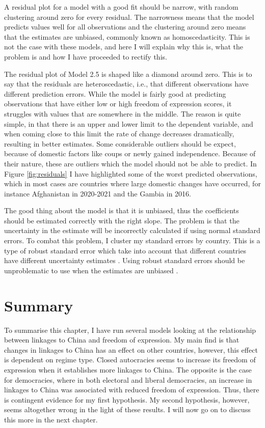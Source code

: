 A residual plot for a model with a good fit should be narrow, with random clustering around zero for every residual. The narrowness means that the model predicts values well for all observations and the clustering around zero means that the estimates are unbiased, commonly known as homoscedasticity. This is not the case with these models, and here I will explain why this is, what the problem is and how I have proceeded to rectify this.

The residual plot of Model 2.5 is shaped like a diamond around zero. This is to say that the residuals are heteroscedastic, i.e., that different observations have different prediction errors. While the model is fairly good at predicting observations that have either low or high freedom of expression scores, it struggles with values that are somewhere in the middle. The reason is quite simple, in that there is an upper and lower limit to the dependent variable, and when coming close to this limit the rate of change decreases dramatically, resulting in better estimates. Some considerable outliers should be expect, because of domestic factors like coups or newly gained independence. Because of their nature, these are outliers which the model should not be able to predict. In Figure \ref{fig:residuals} I have highlighted some of the worst predicted observations, which in most cases are countries where large domestic changes have occurred, for instance Afghanistan in 2020-2021 and the Gambia in 2016. 

The good thing about the model is that it is unbiased, thus the coefficients should be estimated correctly with the right slope. The problem is that the uncertainty in the estimate will be incorrectly calculated if using normal standard errors. To combat this problem, I cluster my standard errors by country. This is a type of robust standard error which take into account that different countries have different uncertainty estimates \citep{moulton_random_1986, huntington-klein_effect_2022}. Using robust standard errors should be unproblematic to use when the estimates are unbiased \citep[p. 60]{wooldridge_econometric_2010}.

\section{Summary}
To summarise this chapter, I have run several models looking at the relationship between linkages to China and freedom of expression. My main find is that changes in linkages to China has an effect on other countries, however, this effect is dependent on regime type. Closed autocracies seems to increase its freedom of expression when it establishes more linkages to China. The opposite is the case for democracies, where in both electoral and liberal democracies, an increase in linkages to China was associated with reduced freedom of expression. Thus, there is contingent evidence for my first hypothesis. My second hypothesis, however, seems altogether wrong in the light of these results. I will now go on to discuss this more in the next chapter.